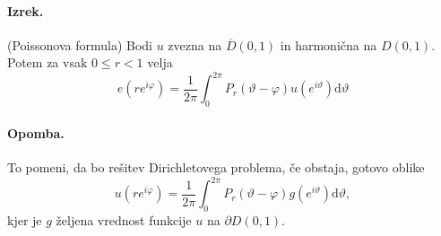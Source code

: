 \documentclass[a4paper]{article}
\newcommand{\dif}{\mathrm{d}}
\begin{document}
\paragraph{Izrek.} (Poissonova formula) Bodi $u$ zvezna na $\overline{D}(0, 1)$ in harmonična na $D(0, 1)$. Potem za vsak $0 \leq r < 1$ velja
$$e(re^{i\varphi}) = \frac{1}{2\pi}\int_{0}^{2\pi} P_r(\vartheta - \varphi) u(e^{i\vartheta})\dif\vartheta$$
\paragraph{Opomba.} To pomeni, da bo rešitev Dirichletovega problema, če obstaja, gotovo oblike
$$u(re^{i\varphi}) = \frac{1}{2\pi}\int_{0}^{2\pi}P_r(\vartheta - \varphi)g(e^{i\vartheta})\dif\vartheta,$$
kjer je $g$ željena vrednost funkcije $u$ na $\partial D(0, 1)$.
\end{document}
